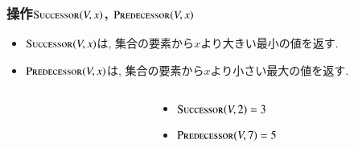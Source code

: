 \documentclass[main]{subfiles}
\begin{document}
\begin{frame}\frametitle{操作$\mathrm{\text{S\textsc{uccessor}}}(V,x)$, $\mathrm{\text{P\textsc{redecessor}}}(V,x)$}
\begin{itemize}
	\item $\mathrm{\text{S\textsc{uccessor}}}(V,x)$は, 集合の要素から$x$より大きい最小の値を返す.\\
	\item $\mathrm{\text{P\textsc{redecessor}}}(V,x)$は, 集合の要素から$x$より小さい最大の値を返す.\\
\end{itemize}

\begin{columns}[c]
	\begin{column}{0.5\linewidth}
		
	\end{column}
	\begin{column}{0.49\linewidth}
		\begin{itemize}
			\item $\mathrm{\text{S\textsc{uccessor}}}(V,2) = 3$\\
			\item $\mathrm{\text{P\textsc{redecessor}}}(V,7) = 5$\\
		\end{itemize}
	\end{column}
\end{columns}
\end{frame}
\end{document}
